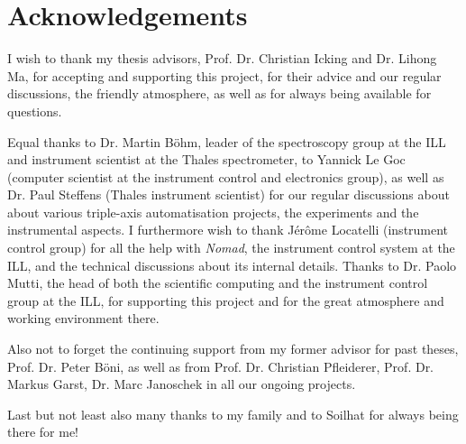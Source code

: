 %
%

\chapter*{Acknowledgements}

I wish to thank my thesis advisors, Prof. Dr. Christian Icking and Dr. Lihong Ma, for accepting 
and supporting this project, for their advice and our regular discussions, the friendly atmosphere, 
as well as for always being available for questions.

Equal thanks to Dr. Martin B\"ohm, leader of the spectroscopy group at the ILL and instrument 
scientist at the Thales spectrometer, to Yannick Le Goc (computer scientist at the instrument 
control and electronics group), as well as Dr. Paul Steffens (Thales instrument scientist) for our 
regular discussions about about various triple-axis automatisation projects, the experiments and the
instrumental aspects. I furthermore wish to thank Jérôme Locatelli (instrument control group) for
all the help with \textit{Nomad}, the instrument control system at the ILL, and the technical discussions
about its internal details. 
Thanks to Dr. Paolo Mutti, the head of both the scientific computing and the instrument control group 
at the ILL, for supporting this project and for the great atmosphere and working environment there.

Also not to forget the continuing support from my former advisor for past theses, Prof. Dr. Peter B\"oni,
as well as from Prof. Dr. Christian Pfleiderer, Prof. Dr. Markus Garst, Dr. Marc Janoschek in all our ongoing projects.

Last but not least also many thanks to my family and to Soilhat for always being there for me!
